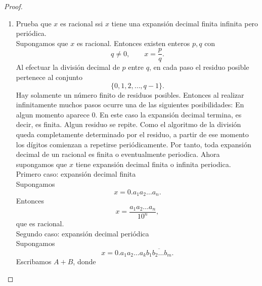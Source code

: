 \documentclass[12pt,a4paper]{article}
\begin{document}
    \begin{proof}
        \begin{enumerate}
            \item[(a)] Prueba que $x$ es racional ssi $x$ tiene una expansión decimal finita
            infinita pero periódica.\\
            Supongamos que $x$ es racional. Entonces existen enteros $p,q$ con
            \begin{equation*}
                q\neq0,\qquad x=\frac{p}{q}.
            \end{equation*}
            Al efectuar la división decimal de $p$ entre $q$, en cada paso el residuo posible
            pertenece al conjunto
            \begin{equation*}
                \{0,1,2,\dots,q-1\}.
            \end{equation*}
            Hay solamente un número finito de residuos posibles. Entonces  al realizar infinitamente
            muchos pasos ocurre una de las siguientes posibilidades: En algun momento aparece 0.
            En este caso la expansión decimal termina, es decir, es finita. Algun residuo se repite.
            Como el algoritmo de la división queda completamente determinado por el residuo, a partir
            de ese momento los dígitos comienzan a repetirse periódicamente. Por tanto, toda expansión
            decimal de un racional es finita o eventualmente periodica. Ahora supongamos que $x$ tiene
            expansión decimal finita o infinita periodica.\\
            Primero caso: expansión decimal finita\\
            Supongamos
            \begin{equation*}
                x=0.a_{1}a_{2}\dots a_{n}.
            \end{equation*}
            Entonces
            \begin{equation*}
                x=\frac{a_{1}a_{2}\dots a_{n}}{10^{n}},
            \end{equation*}
            que es racional.\\
            Segundo caso: expansión decimal periódica\\
            Supongamos
            \begin{equation*}
                x=0.a_{1}a_{2}\dots a_{k}\overline{b_{1}b_{2}\dots b_{m}}.
            \end{equation*}
            Escribamos $A+B$, donde
            \begin{equation*}

\end{equation*}
\end{enumerate}
\end{proof}
\end{document}
